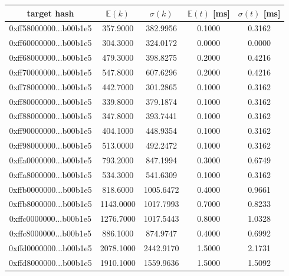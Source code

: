 \documentclass[12pt, a4paper]{article}
\begin{document}
\begin{table}[H]
    \centering
    \begin{tabular}{|c|c|c|c|c|} \hline
    target hash  & $\mathbb{E}(k)$ & $\sigma(k) $ & $\mathbb{E}(t)$ [ms] & $\sigma(t)$ [ms] \\ \hline
    0xff58000000...b00b1e5 &      357.9000 &      382.9956 &         0.1000 &        0.3162 \\ \hline
0xff60000000...b00b1e5 &      304.3000 &      324.0172 &         0.0000 &        0.0000 \\ \hline
0xff68000000...b00b1e5 &      479.3000 &      398.8275 &         0.2000 &        0.4216 \\ \hline
0xff70000000...b00b1e5 &      547.8000 &      607.6296 &         0.2000 &        0.4216 \\ \hline
0xff78000000...b00b1e5 &      442.7000 &      301.2865 &         0.1000 &        0.3162 \\ \hline
0xff80000000...b00b1e5 &      339.8000 &      379.1874 &         0.1000 &        0.3162 \\ \hline
0xff88000000...b00b1e5 &      347.8000 &      393.7441 &         0.1000 &        0.3162 \\ \hline
0xff90000000...b00b1e5 &      404.1000 &      448.9354 &         0.1000 &        0.3162 \\ \hline
0xff98000000...b00b1e5 &      513.0000 &      492.2472 &         0.1000 &        0.3162 \\ \hline
0xffa0000000...b00b1e5 &      793.2000 &      847.1994 &         0.3000 &        0.6749 \\ \hline
0xffa8000000...b00b1e5 &      534.3000 &      541.6309 &         0.1000 &        0.3162 \\ \hline
0xffb0000000...b00b1e5 &      818.6000 &     1005.6472 &         0.4000 &        0.9661 \\ \hline
0xffb8000000...b00b1e5 &     1143.0000 &     1017.7993 &         0.7000 &        0.8233 \\ \hline
0xffc0000000...b00b1e5 &     1276.7000 &     1017.5443 &         0.8000 &        1.0328 \\ \hline
0xffc8000000...b00b1e5 &      886.1000 &      874.9747 &         0.4000 &        0.6992 \\ \hline
0xffd0000000...b00b1e5 &     2078.1000 &     2442.9170 &         1.5000 &        2.1731 \\ \hline
0xffd8000000...b00b1e5 &     1910.1000 &     1559.9636 &         1.5000 &        1.5092 \\ \hline

\end{tabular}
\end{table}
\end{document}
